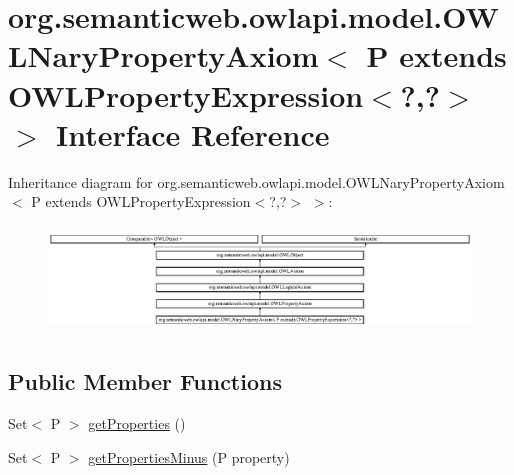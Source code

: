 \hypertarget{interfaceorg_1_1semanticweb_1_1owlapi_1_1model_1_1_o_w_l_nary_property_axiom_3_01_p_01extends_01ea844dc139c8e4dddb91655b52ab9e06}{\section{org.\-semanticweb.\-owlapi.\-model.\-O\-W\-L\-Nary\-Property\-Axiom$<$ P extends O\-W\-L\-Property\-Expression$<$?,?$>$ $>$ Interface Reference}
\label{interfaceorg_1_1semanticweb_1_1owlapi_1_1model_1_1_o_w_l_nary_property_axiom_3_01_p_01extends_01ea844dc139c8e4dddb91655b52ab9e06}
}
Inheritance diagram for org.\-semanticweb.\-owlapi.\-model.\-O\-W\-L\-Nary\-Property\-Axiom$<$ P extends O\-W\-L\-Property\-Expression$<$?,?$>$ $>$\-:\begin{figure}[H]
\begin{center}
\leavevmode
\includegraphics[height=2.842640cm]{interfaceorg_1_1semanticweb_1_1owlapi_1_1model_1_1_o_w_l_nary_property_axiom_3_01_p_01extends_01ea844dc139c8e4dddb91655b52ab9e06}
\end{center}
\end{figure}
\subsection*{Public Member Functions}
\begin{DoxyCompactItemize}
\item 
Set$<$ P $>$ \hyperlink{interfaceorg_1_1semanticweb_1_1owlapi_1_1model_1_1_o_w_l_nary_property_axiom_3_01_p_01extends_01ea844dc139c8e4dddb91655b52ab9e06_aecd8cc29001db85517b9855f8195fb72}{get\-Properties} ()
\item 
Set$<$ P $>$ \hyperlink{interfaceorg_1_1semanticweb_1_1owlapi_1_1model_1_1_o_w_l_nary_property_axiom_3_01_p_01extends_01ea844dc139c8e4dddb91655b52ab9e06_a2fc525a4108094c02c8de402685ddf7d}{get\-Properties\-Minus} (P property)
\end{DoxyCompactItemize}


